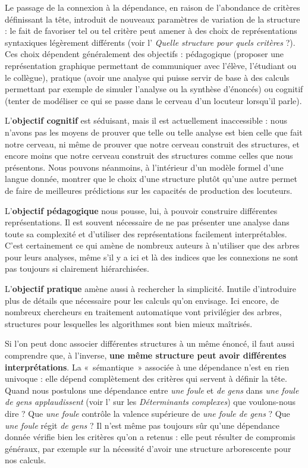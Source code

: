 Le passage de la connexion à la dépendance, en raison de l’abondance de critères définissant la tête, introduit de nouveaux paramètres de variation de la structure : le fait de favoriser tel ou tel critère peut amener à des choix de représentations syntaxiques légèrement différents (voir l’ \textit{Quelle structure pour quels critères} ?). Ces choix dépendent généralement des objectifs : pédagogique (proposer une représentation graphique permettant de communiquer avec l’élève, l’étudiant ou le collègue), pratique (avoir une analyse qui puisse servir de base à des calculs permettant par exemple de simuler l’analyse ou la synthèse d’énoncés) ou cognitif (tenter de modéliser ce qui se passe dans le cerveau d’un locuteur lorsqu’il parle).

L’\textbf{objectif cognitif} est séduisant, mais il est actuellement inaccessible : nous n’avons pas les moyens de prouver que telle ou telle analyse est bien celle que fait notre cerveau, ni même de prouver que notre cerveau construit des structures, et encore moins que notre cerveau construit des structures comme celles que nous présentons. Nous pouvons néanmoins, à l’intérieur d’un modèle formel d’une langue donnée, montrer que le choix d’une structure plutôt qu’une autre permet de faire de meilleures prédictions sur les capacités de production des locuteurs.

L’\textbf{objectif pédagogique} nous pousse, lui, à pouvoir construire différentes représentations. Il est souvent nécessaire de ne pas présenter une analyse dans toute sa complexité et d’utiliser des représentations facilement interprétables. C’est certainement ce qui amène de nombreux auteurs à n’utiliser que des arbres pour leurs analyses, même s’il y a ici et là des indices que les connexions ne sont pas toujours si clairement hiérarchisées.

L’\textbf{objectif pratique} amène aussi à rechercher la simplicité. Inutile d’introduire plus de détails que nécessaire pour les calculs qu’on envisage. Ici encore, de nombreux chercheurs en traitement automatique vont privilégier des arbres, structures pour lesquelles les algorithmes sont bien mieux maîtrisés.

Si l’on peut donc associer différentes structures à un même énoncé, il faut aussi comprendre que, à l’inverse, \textbf{une même structure peut avoir différentes interprétations}. La «~sémantique~» associée à une dépendance n’est en rien univoque : elle dépend complètement des critères qui servent à définir la tête. Quand nous postulons une dépendance entre \textit{une foule} et \textit{de gens} dans \textit{une foule de gens applaudissent} (voir l’ sur les \textit{Déterminants complexes}) que voulons-nous dire ? Que \textit{une foule} contrôle la valence supérieure de \textit{une foule de gens} ? Que \textit{une foule} régit \textit{de gens} ? Il n’est même pas toujours sûr qu’une dépendance donnée vérifie bien les critères qu’on a retenus : elle peut résulter de compromis généraux, par exemple sur la nécessité d’avoir une structure arborescente pour nos calculs.


